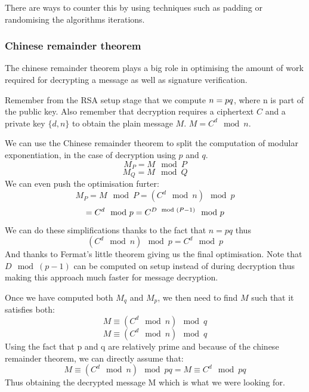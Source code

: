 \documentclass[conference]{IEEEtran}
\begin{document}
There are ways to counter this by using techniques such as padding or randomising the 
algorithms iterations.

\subsubsection*{Chinese remainder theorem}
The chinese remainder theorem plays a big role in optimising 
the amount of work required for decrypting a message as well as 
signature verification.


Remember from the RSA setup stage that we compute 
$n = p\*q$, where n is part of the public key.
Also remember that decryption requires a ciphertext $C$ and
a private key $\{d,n\}$ to obtain the plain message $M$.
$M = C^{d}\mod n$.

We can use the Chinese remainder theorem to split the computation of
modular exponentiation, in the case of decryption using $p$ and $q$.
\begin{equation*}
    M_{P} = M\mod P
\end{equation*}
\begin{equation*}
    M_{Q} = M\mod Q
\end{equation*}
We can even push the optimisation furter:
\begin{equation*}
    M_{P} = M\mod P = (C^{d}\mod n)\mod p
\end{equation*}
\begin{equation*}
    = C^{d}\mod p\\ = C^{D\mod(P-1)}\mod p
\end{equation*}
We can do these simplifications thanks to the fact that $n = pq$ thus 
\begin{equation*}
    (C^{d}\mod n)\mod p = C^{d}\mod p
\end{equation*}
And thanks to Fermat's little theorem giving us the final optimisation.
Note that $D\mod(p - 1)$ can be computed on setup instead of during decryption
thus making this approach much faster for message decryption.

Once we have computed both $M_{q}$ and $M_{p}$, we then need to find $M$ such 
that it satisfies both:
\begin{equation*}
    M \equiv (C^{d}\mod n)\mod q
\end{equation*}
\begin{equation*}
    M \equiv (C^{d}\mod n)\mod q
\end{equation*}
Using the fact that p and q are relatively prime and because of the 
chinese remainder theorem, we can directly assume that:
\begin{equation*}
    M \equiv (C^{d}\mod n)\mod pq = M \equiv C^{d}\mod pq
\end{equation*}
Thus obtaining the decrypted message M which is what we were looking for.
\end{document}

